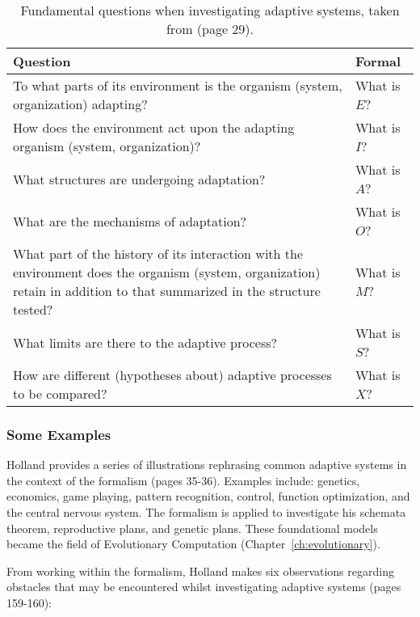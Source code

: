 \begin{table}[ht]
	\centering\small
		\begin{tabularx}{\textwidth}{Xl}
		\toprule
		\textbf{Question} & \textbf{Formal} \\ 
		\toprule
		To what parts of its environment is the organism (system, organization) adapting? & What is $E$? \\ 
		\midrule
		How does the environment act upon the adapting organism (system, organization)? & What is $I$? \\ 
		\midrule
		What structures are undergoing adaptation? & What is $A$? \\ 
		\midrule
		What are the mechanisms of adaptation? & What is $O$? \\ 
		\midrule
		What part of the history of its interaction with the environment does the organism (system, organization) retain in addition to that summarized in the structure tested? & What is $M$? \\ 
		\midrule
		What limits are there to the adaptive process? & What is $S$? \\ 
		\midrule
		How are different (hypotheses about) adaptive processes to be compared? & What is $X$? \\ 
		\bottomrule
		\end{tabularx}	
	\caption{Fundamental questions when investigating adaptive systems, taken from \cite{Holland1975} (page 29).}
	\label{tab:adaptsys:questions}
\end{table}


\subsubsection{Some Examples}
Holland provides a series of illustrations rephrasing common adaptive systems in the context of the formalism \cite{Holland1975} (pages 35-36). Examples include: genetics, economics, game playing, pattern recognition, control, function optimization, and the central nervous system. The formalism is applied to investigate his schemata theorem, reproductive plans, and genetic plans. These foundational models became the field of Evolutionary Computation (Chapter~\ref{ch:evolutionary}). 

From working within the formalism, Holland makes six observations regarding obstacles that may be encountered whilst investigating adaptive systems \cite{Holland1975} (pages 159-160): 

